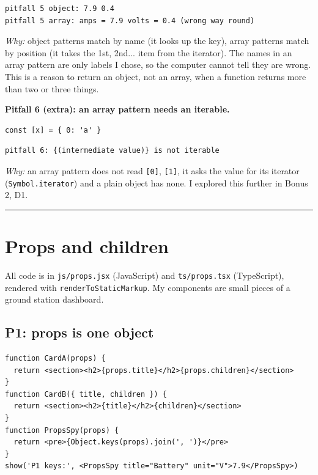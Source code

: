 \begin{lstlisting}
pitfall 5 object: 7.9 0.4
pitfall 5 array: amps = 7.9 volts = 0.4 (wrong way round)
\end{lstlisting}

\emph{Why:} object patterns match by name (it looks up the key), array patterns match by position (it takes the 1st, 2nd... item from the iterator). The names in an array pattern are only labels I chose, so the computer cannot tell they are wrong. This is a reason to return an object, not an array, when a function returns more than two or three things.

\textbf{Pitfall 6 (extra): an array pattern needs an iterable.}

\begin{lstlisting}
const [x] = { 0: 'a' }
\end{lstlisting}

\begin{lstlisting}
pitfall 6: {(intermediate value)} is not iterable
\end{lstlisting}

\emph{Why:} an array pattern does not read \passthrough{\lstinline![0]!}, \passthrough{\lstinline![1]!}, it asks the value for its iterator (\passthrough{\lstinline!Symbol.iterator!}) and a plain object has none. I explored this further in Bonus 2, D1.

\begin{center}\rule{0.5\linewidth}{0.5pt}\end{center}

\hypertarget{props-and-children}{%
\section{Props and children}\label{props-and-children}}

All code is in \passthrough{\lstinline!js/props.jsx!} (JavaScript) and \passthrough{\lstinline!ts/props.tsx!} (TypeScript), rendered with \passthrough{\lstinline!renderToStaticMarkup!}. My components are small pieces of a ground station dashboard.

\hypertarget{p1-props-is-one-object}{%
\subsection{P1: props is one object}\label{p1-props-is-one-object}}

\begin{lstlisting}
function CardA(props) {
  return <section><h2>{props.title}</h2>{props.children}</section>
}
function CardB({ title, children }) {
  return <section><h2>{title}</h2>{children}</section>
}
function PropsSpy(props) {
  return <pre>{Object.keys(props).join(', ')}</pre>
}
show('P1 keys:', <PropsSpy title="Battery" unit="V">7.9</PropsSpy>)
\end{lstlisting}

